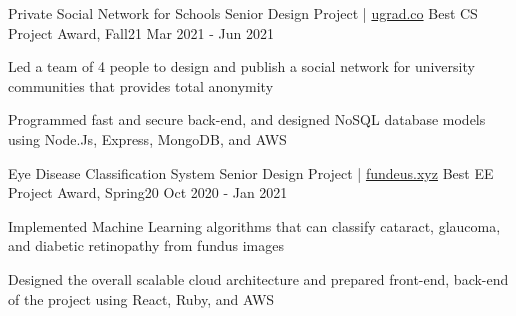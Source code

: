 
\begin{cventries}
\cvopenentry
   {Private Social Network for Schools} %
    {Senior Design Project | \href{https://ugrad.co}{ugrad.co}} %
    {Best CS Project Award, Fall21} %
    {Mar 2021 - Jun 2021} %
    {
      \begin{cvitems} %
        \item {Led a team of 4 people to design and publish a social network for university communities that provides total anonymity}
      	\item {Programmed fast and secure back-end, and designed NoSQL database models using Node.Js, Express, MongoDB, and AWS}
      \end{cvitems}
    }
\cvopenentry
   {Eye Disease Classification System} %
    {Senior Design Project | \href{https://fundeus.xyz}{fundeus.xyz}} %
    {Best EE Project Award, Spring20} %
    {Oct 2020 - Jan 2021} %
    {
      \begin{cvitems} %
      	\item {Implemented Machine Learning algorithms that can classify cataract, glaucoma, and diabetic retinopathy from fundus images}
      	\item {Designed the overall scalable cloud architecture and prepared front-end, back-end of the project using React, Ruby, and AWS}
      \end{cvitems}
    }
\end{cventries}
